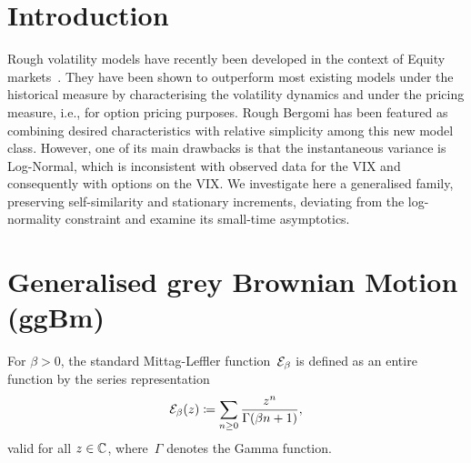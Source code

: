 \section{Introduction}

Rough volatility models have recently been developed in the context of Equity markets~\cite{Gatheral2018VolatilityRough}. They have been shown to outperform most existing models under the historical measure by characterising the volatility dynamics and under the pricing measure, i.e., for option pricing purposes. Rough Bergomi has been featured as combining desired characteristics with relative simplicity among this new model class. However, one of its main drawbacks is that the instantaneous variance is Log-Normal, which is inconsistent with observed data for the VIX and consequently with options on the VIX. We investigate here a generalised family, preserving self-similarity and stationary increments, deviating from the log-normality constraint and examine its small-time asymptotics.

\section{Generalised grey Brownian Motion (ggBm)}\label{sec:ggBm_definitions}

For $\beta>0$, the standard Mittag-Leffler function~$\mathcal{E}_{\beta}$ is defined as an entire function by the series representation
\begin{equation}\label{def:MLf}
\mathcal{E}_{\beta}(z)\coloneqq\sum_{n\geq 0} \frac{z^n}{\Gamma(\beta n+1)},
\end{equation}
valid for all $z \in \mathbb{C}$, where~$\Gamma$ denotes the Gamma function. 

